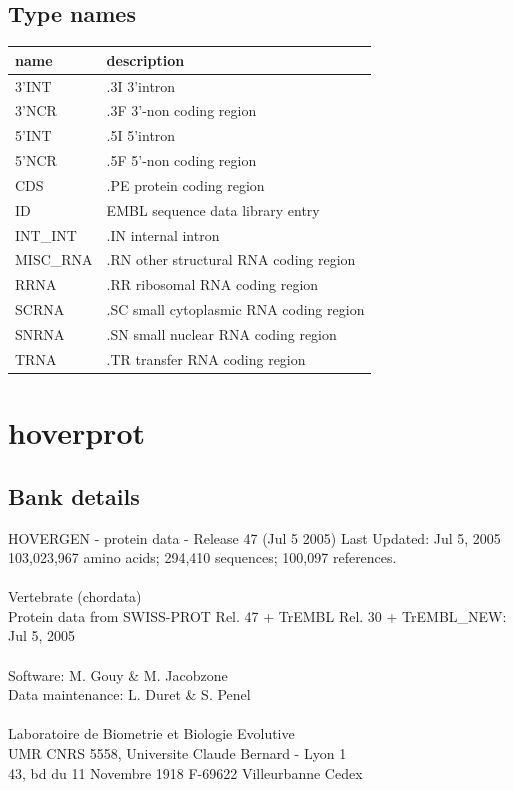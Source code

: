 \documentclass{article}
\begin{document}
\begin{Schunk}
\subsection{Type names}
\noindent\begin{tabular}{ll}
\hline \hline
name & description\\
\hline
3'INT & .3I 3'intron \\
3'NCR & .3F  3'-non coding region \\
5'INT & .5I 5'intron \\
5'NCR & .5F  5'-non coding region \\
CDS & .PE protein coding region \\
ID & EMBL sequence data library entry \\
INT\_INT & .IN  internal intron \\
MISC\_RNA & .RN other structural RNA coding region \\
RRNA & .RR ribosomal RNA coding region \\
SCRNA & .SC small cytoplasmic RNA coding region \\
SNRNA & .SN small nuclear RNA coding region \\
TRNA & .TR transfer RNA coding region \\
\hline \hline
\end{tabular}

\section{ hoverprot }
\subsection{Bank details}
HOVERGEN - protein data - Release 47 (Jul 5 2005) Last Updated: Jul  5, 2005\\
103,023,967 amino acids; 294,410 sequences; 100,097 references.\\
\\
Vertebrate (chordata)	\\
Protein data from SWISS-PROT Rel. 47  + TrEMBL Rel. 30 + TrEMBL\_NEW: Jul 5, 2005\\
\\
Software: M. Gouy \& M. Jacobzone\\
Data maintenance: L. Duret \& S. Penel\\
\\
Laboratoire de Biometrie et Biologie Evolutive\\
UMR CNRS 5558, Universite Claude Bernard - Lyon 1\\
43, bd du 11 Novembre 1918 F-69622 Villeurbanne Cedex\\



\end{Schunk}
\end{document}
